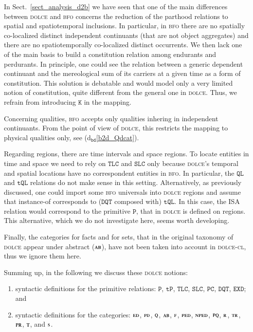 \documentclass[ao]{iosart2x}
\newcommand{\bdDefLabel}{\textrm{d$_\texttt{bd}$}}
\newcommand{\refbddf}[1]{({\bdDefLabel}\ref{#1})}
\newcommand{\pr}[1]{\mathtt{#1}}
\newcommand{\dolce}{{\textsc{dolce}}}
\newcommand{\bfo}{{\textsc{bfo}}}
\newcommand {\ABdcat} {\textsc{ab}}
\newcommand {\EDdcat} {\textsc{ed}}
\newcommand {\Fdcat} {\textsc{f}}
\newcommand {\NPEDdcat} {\textsc{nped}}
\newcommand {\PDdcat} {\textsc{pd}}
\newcommand {\PEDdcat} {\textsc{ped}}
\newcommand {\PQdcat} {\textsc{pq}}
\newcommand {\PRdcat} {\textsc{pr}}
\newcommand {\Qdcat} {\textsc{q}}
\newcommand {\Rdcat} {\textsc{r}}
\newcommand {\Sdcat} {\textsc{s}}
\newcommand {\TRdcat} {\textsc{tr}}
\newcommand {\Tdcat} {\textsc{t}}
\newcommand {\TPd} {\ensuremath{\pr{tP}}}
\newcommand {\Pd} {\ensuremath{\pr{P}}}
\newcommand {\DQTd} {\ensuremath{\pr{DQT}}}
\newcommand {\QLd} {\ensuremath{\pr{QL}}}
\newcommand {\TQLd} {\ensuremath{\pr{tQL}}}
\newcommand {\PCd} {\ensuremath{\pr{PC}}}
\newcommand {\Kd} {\ensuremath{\pr{K}}}
\newcommand {\EXDd} {\ensuremath{\pr{EXD}}}
\newcommand {\SLCd} {\ensuremath{\pr{SLC}}}
\newcommand {\TLCd} {\ensuremath{\pr{TLC}}}
\begin{document}
In Sect.~\ref{sect_analysis_d2b} we have seen that one of the main differences between {\dolce} and {\bfo} concerns the reduction of the parthood relations to spatial and spatiotemporal inclusions. In particular, in {\bfo} there are no spatially co-localized distinct independent continuants (that are not object aggregates) and there are no spatiotemporally co-localized distinct occurrents. We then lack one of the main basis to build a constitution relation among endurants and perdurants. In principle, one could see the relation between a generic dependent continuant and the mereological sum of its carriers at a given time as a form of constitution. This solution is debatable and would model only a very limited notion of constitution, quite different from the general one in {\dolce}. Thus, we refrain from introducing $\Kd$ in the mapping.  

Concerning qualities, {\bfo} accepts only qualities inhering in independent continuants. From the point of view of {\dolce}, this restricts the mapping to physical qualities only, see \refbddf{b2d_Qdcat}. 

Regarding regions, there are time intervals and space regions. To locate entities in time and space we need to rely on $\TLCd$ and $\SLCd$ only because {\dolce}'s temporal and spatial locations have no correspondent entities in {\bfo}. In particular, the $\QLd$ and $\TQLd$ relations do not make sense in this setting. Alternatively, as previously discussed, one could import some {\bfo} universals into {\dolce} regions and assume that instance-of corresponds to ($\DQTd$ composed with) $\TQLd$. In this case, the ISA relation would correspond to the primitive $\Pd$, that in {\dolce} is defined on regions. This alternative, which we do not investigate here, seems worth developing. %
%

Finally, the categories for facts and for sets, that in the original taxonomy of {\dolce} \citep{D18} appear under abstract ($\ABdcat$), have not been taken into account in {\dolce}-\textsc{cl}, thus we ignore them here. 
 

\smallskip
Summing up, in the following we discuss these {\dolce} notions: 
\begin{enumerate}[$(i)$]
\item syntactic definitions for the primitive relations: $\Pd$, $\TPd$, $\TLCd$, $\SLCd$, $\PCd$, $\DQTd$, $\EXDd$; and 
\item syntactic definitions for the categories: $\EDdcat$, $\PDdcat$, $\Qdcat$, $\ABdcat$, $\Fdcat$, $\PEDdcat$, $\NPEDdcat$, $\PQdcat$, $\Rdcat$, $\TRdcat$, $\PRdcat$, $\Tdcat$, and $\Sdcat$.
\end{enumerate}
\end{document}
